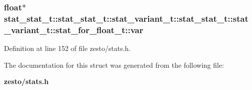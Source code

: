 \subsubsection[{var}]{\setlength{\rightskip}{0pt plus 5cm}float$\ast$ stat\_\-stat\_\-t::stat\_\-stat\_\-t::stat\_\-variant\_\-t::stat\_\-stat\_\-t::stat\_\-variant\_\-t::stat\_\-for\_\-float\_\-t::var}\label{structstat__stat__t_1_1stat__variant__t_1_1stat__for__float__t_e2aff281c83fa642d9c52d8c446c27fc}




Definition at line 152 of file zesto/stats.h.

The documentation for this struct was generated from the following file:\begin{CompactItemize}
\item 
{\bf zesto/stats.h}\end{CompactItemize}
